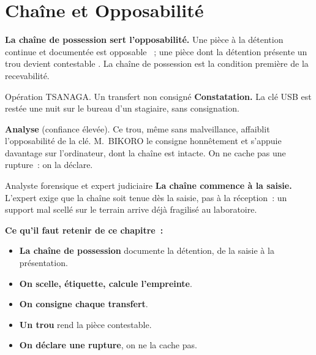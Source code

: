 \section{Chaîne et Opposabilité}
\label{sec:c05-opposabilite}

\begin{boxCRO}
\textbf{La chaîne de possession sert l'opposabilité.} Une pièce à la
détention continue et documentée est opposable ~; une pièce dont
la détention présente un trou devient contestable . La chaîne de
possession est la condition première de la recevabilité.
\end{boxCRO}

\begin{boxscenario}{Opération TSANAGA. Un transfert non consigné}
\textbf{Constatation.} La clé USB est restée une nuit sur le bureau d'un
stagiaire, sans consignation.

\medskip
\textbf{Analyse} (confiance élevée). Ce trou, même sans malveillance,
affaiblit l'opposabilité de la clé. M.~BIKORO le consigne honnêtement et
s'appuie davantage sur l'ordinateur, dont la chaîne est intacte. On ne cache
pas une rupture~: on la déclare.
\end{boxscenario}

\begin{boxmetier}{Analyste forensique et expert judiciaire}
\textbf{La chaîne commence à la saisie.} L'expert exige que la chaîne soit
tenue dès la saisie, pas à la réception~: un support mal scellé sur le
terrain arrive déjà fragilisé au laboratoire.
\end{boxmetier}

\separateur

\begin{boxresume}
\textbf{Ce qu'il faut retenir de ce chapitre~:}
\begin{itemize}
    \item \textbf{La chaîne de possession} documente la détention, de la
          saisie à la présentation.
    \item \textbf{On scelle, étiquette, calcule l'empreinte}.
    \item \textbf{On consigne chaque transfert}.
    \item \textbf{Un trou} rend la pièce contestable.
    \item \textbf{On déclare une rupture}, on ne la cache pas.
\end{itemize}
\end{boxresume}

